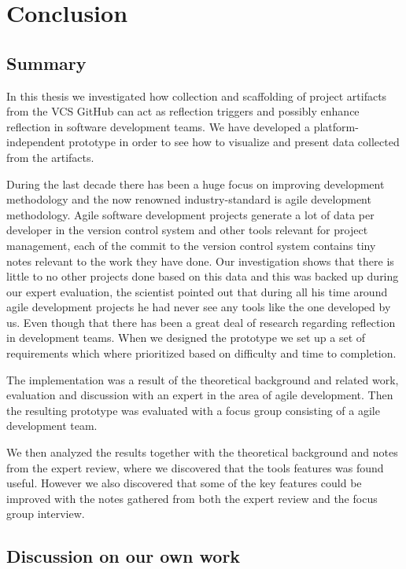 \chapter{Conclusion}
 
\section{Summary}
In this thesis we investigated how collection and scaffolding of project artifacts from the VCS GitHub can act as reflection triggers and possibly enhance reflection in software development teams. We have developed a platform-independent prototype in order to see how to visualize and present data collected from the artifacts.

During the last decade there has been a huge focus on improving development methodology and the now renowned industry-standard is agile development methodology. Agile software development projects generate a lot of data per developer in the version control system and other tools relevant for project management, each of the commit to the version control system contains tiny notes relevant to the work they have done. Our investigation shows that there is little to no other projects done based on this data and this was backed up during our expert evaluation, the scientist pointed out that during all his time around agile development projects he had never see any tools like the one developed by us. Even though that there has been a great deal of research regarding reflection in development teams. When we designed the prototype we set up a set of requirements which where prioritized based on difficulty and time to completion.

The implementation was a result of the theoretical background and related work, evaluation and discussion with an expert in the area of agile development. Then the resulting prototype was evaluated with a focus group consisting of a agile development team.

We then analyzed the results together with the theoretical background and notes from the expert review, where we discovered that the tools features was found useful. However we also discovered that some of the key features could be improved with the notes gathered from both the expert review and the focus group interview.

\section{Discussion on our own work}


